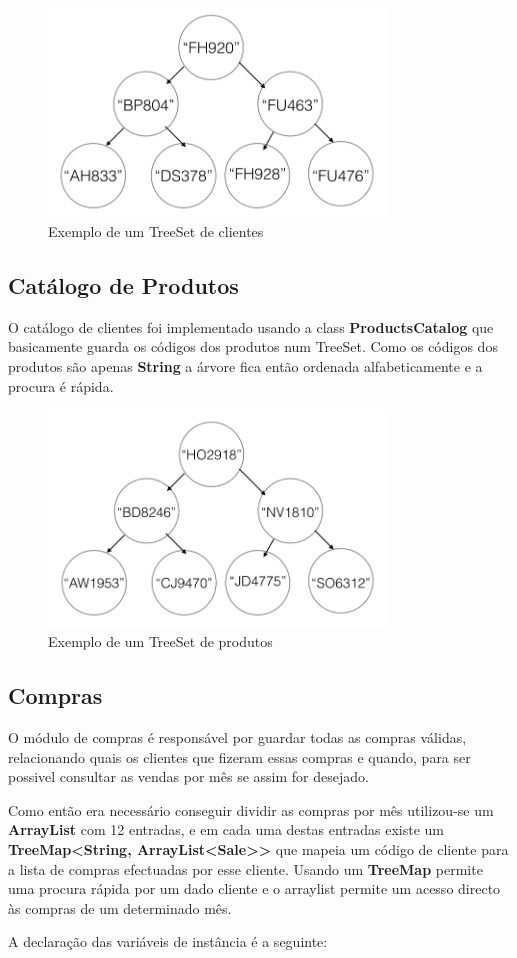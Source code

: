 \documentclass[10pt] {article}
\begin{document}
\begin{figure}[ht!]
\centering
\includegraphics[width=90mm]{catclientes.png}
\caption{Exemplo de um TreeSet de clientes}
\end{figure}

\newpage
\subsection{Catálogo de Produtos}
\par O catálogo de clientes foi implementado usando a class  \textbf{ProductsCatalog} que basicamente guarda os códigos
dos produtos num TreeSet. Como os códigos dos produtos são apenas \textbf{String} a árvore fica então ordenada
alfabeticamente e a procura é rápida.

\begin{figure}[ht!]
\centering
\includegraphics[width=90mm]{catprodutos.png}
\caption{Exemplo de um TreeSet de produtos}
\label{fig:catprodutos}
\end{figure}

\subsection{Compras}
\par O módulo de compras é responsável por guardar todas as compras válidas, relacionando quais os clientes que fizeram
essas compras e quando, para ser possivel consultar as vendas por mês se assim for desejado.
\par Como então era necessário conseguir dividir as compras por mês utilizou-se um \textbf{ArrayList} com 12 entradas, e
em cada uma destas entradas existe um \textbf{TreeMap\textless String, ArrayList\textless Sale\textgreater\textgreater} que
mapeia um código de cliente para a lista de compras efectuadas por esse cliente. Usando um \textbf{TreeMap} permite uma
procura rápida por um dado cliente e o arraylist permite um acesso directo às compras de um determinado mês.
\par A declaração das variáveis de instância é a seguinte:
\end{document}
